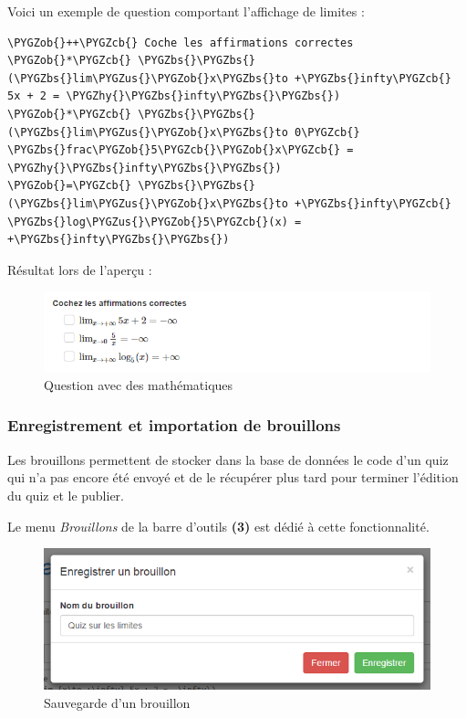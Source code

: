 \documentclass[a4,10pt,french]{sphinxmanual}
\def\PYGZbs{\char`\\}
\def\PYGZus{\char`\_}
\def\PYGZob{\char`\{}
\def\PYGZcb{\char`\}}
\def\PYGZhy{\char`\-}
\begin{document}
Voici un exemple de question comportant l'affichage de limites :

\begin{Verbatim}[commandchars=\\\{\}]
\PYGZob{}++\PYGZcb{} Coche les affirmations correctes
\PYGZob{}*\PYGZcb{} \PYGZbs{}\PYGZbs{}(\PYGZbs{}lim\PYGZus{}\PYGZob{}x\PYGZbs{}to +\PYGZbs{}infty\PYGZcb{} 5x + 2 = \PYGZhy{}\PYGZbs{}infty\PYGZbs{}\PYGZbs{})
\PYGZob{}*\PYGZcb{} \PYGZbs{}\PYGZbs{}(\PYGZbs{}lim\PYGZus{}\PYGZob{}x\PYGZbs{}to 0\PYGZcb{} \PYGZbs{}frac\PYGZob{}5\PYGZcb{}\PYGZob{}x\PYGZcb{} = \PYGZhy{}\PYGZbs{}infty\PYGZbs{}\PYGZbs{})
\PYGZob{}=\PYGZcb{} \PYGZbs{}\PYGZbs{}(\PYGZbs{}lim\PYGZus{}\PYGZob{}x\PYGZbs{}to +\PYGZbs{}infty\PYGZcb{} \PYGZbs{}log\PYGZus{}\PYGZob{}5\PYGZcb{}(x) = +\PYGZbs{}infty\PYGZbs{}\PYGZbs{})
\end{Verbatim}

Résultat lors de l'aperçu :
\begin{figure}[htbp]
\centering
\capstart

\includegraphics[width=0.700\linewidth]{checkbox.png}
\caption{Question avec des mathématiques}\end{figure}


\subsubsection{Enregistrement et importation de brouillons}
\label{doc-user:enregistrement-et-importation-de-brouillons}
Les brouillons permettent de stocker dans la base de données le code d'un quiz qui n'a pas encore été envoyé et de le récupérer plus tard pour terminer l'édition du quiz et le publier.

Le menu \emph{Brouillons} de la barre d'outils \textbf{(3)} est dédié à cette fonctionnalité.
\begin{figure}[htbp]
\centering
\capstart

\includegraphics[width=0.700\linewidth]{draft-save.png}
\caption{Sauvegarde d'un brouillon}\end{figure}
\end{document}
